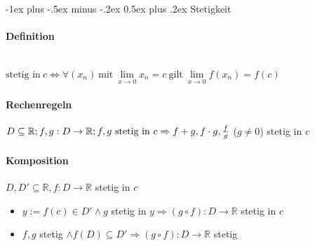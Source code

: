 \documentclass[paper=a3,paper=landscape, fontsize=9pt,DIV=25]{scrartcl}
\makeatletter
\newcommand{\real}{{\mathbb{R}}}
\renewcommand{\section}{\@startsection{section}{1}{0mm}%
  {-1ex plus -.5ex minus -.2ex}%
  {0.5ex plus .2ex}%
  {\color{blue}\normalfont\large\bfseries}}
\makeatother
\begin{document}
\begin{multicols*}{4}



  \section{Stetigkeit}

  \paragraph{Definition}\hspace{0pt} \\
  $\text{stetig in}\ c \Leftrightarrow \forall (x_n) \ \text{mit}\ \lim\limits_{x \rightarrow 0}x_n = c \ \text{gilt}\ \lim\limits_{x \rightarrow 0}f(x_n)=f(c)$

  \paragraph{Rechenregeln}
  $D \subseteq \real;f,g: D \rightarrow \real;f,g ~\text{stetig in}\ c \\ \Rightarrow f+g, f \cdot g,\frac{f}{g}$ ($g \neq 0$) stetig in $c$


  \paragraph{Komposition}
  $D,D' \subseteq \real, f:D \rightarrow \real$ stetig in $c$
  \begin{itemize}
  \item $y := f(c) \in D' \wedge g $ stetig in $y \Rightarrow (g \circ f): D \rightarrow \real$ stetig in $c$
  \item $f,g$ stetig $\wedge f(D) \subseteq D' \Rightarrow (g \circ f): D \rightarrow \real$ stetig
  \end{itemize}



\end{multicols*}
\end{document}
